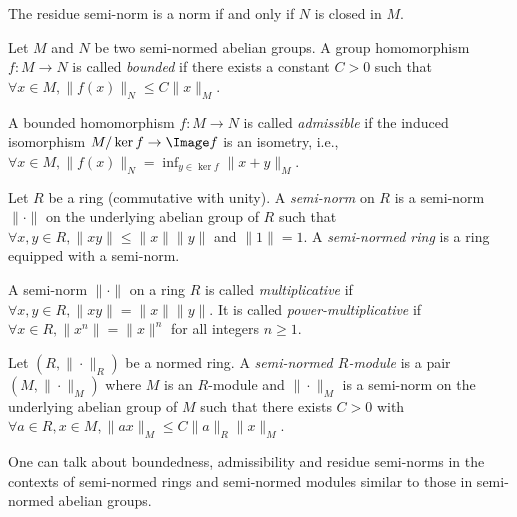    \begin{remark}\label{rmk:residue_semi-norm}
        The residue semi-norm is a norm if and only if \(N\) is closed in \(M\).
    \end{remark}

    \begin{definition}\label{def:bounded_and_admissible_homomorphism}
        Let \(M\) and \(N\) be two semi-normed abelian groups.
        A group homomorphism \(f: M \to N\) is called \emph{bounded} if there exists a constant \(C > 0\) such that \(\forall x \in M, \|f(x)\|_N \leq C\|x\|_M\).
        
        A bounded homomorphism \(f: M \to N\) is called \emph{admissible} if the induced isomorphism \(M/\ker f \to \Image f\) is an isometry, i.e., \(\forall x \in M, \|f(x)\|_N = \inf_{y \in \ker f} \|x + y\|_M\).
    \end{definition}

    \begin{definition}\label{def:semi-normed_rings}
        Let \(R\) be a ring (commutative with unity).
        A \emph{semi-norm} on \(R\) is a semi-norm \(\|\cdot\|\) on the underlying abelian group of \(R\) such that \(\forall x,y \in R, \|xy\| \leq \|x\|\|y\|\) and \(\|1\| = 1\).
        A \emph{semi-normed ring} is a ring equipped with a semi-norm.
    \end{definition}

    \begin{definition}\label{def:multiplicative_and_power_multiplicative_semi-norm}
        A semi-norm \(\|\cdot\|\) on a ring \(R\) is called \emph{multiplicative} if \(\forall x,y \in R, \|xy\| = \|x\|\|y\|\).
        It is called \emph{power-multiplicative} if \(\forall x \in R, \|x^n\| = \|x\|^n\) for all integers \(n \geq 1\).
    \end{definition}

    \begin{definition}\label{def:semi-normed_modules}
        Let \((R, \|\cdot\|_R)\) be a normed ring.
        A \emph{semi-normed \(R\)-module} is a pair \((M, \|\cdot\|_M)\) where \(M\) is an \(R\)-module and \(\|\cdot\|_M\) is a semi-norm on the underlying abelian group of \(M\) such that there exists \(C > 0\) with \(\forall a \in R, x \in M, \|ax\|_M \leq C \|a\|_R \|x\|_M\).
    \end{definition}

    One can talk about boundedness, admissibility and residue semi-norms in the contexts of semi-normed rings and semi-normed modules similar to those in semi-normed abelian groups.

